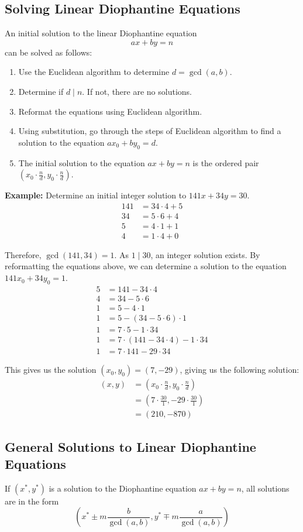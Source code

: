 \documentclass[12pt]{article}
\newcommand{\tdiv}{\; | \;}
\begin{document}
\subsection{Solving Linear Diophantine Equations}
An initial solution to the linear Diophantine equation $$ax + by = n$$ can be solved as follows:
\begin{enumerate}
    \item Use the Euclidean algorithm to determine $d = \gcd{(a, b)}$.
    \item Determine if $d \tdiv n$. If not, there are no solutions.
    \item Reformat the equations using Euclidean algorithm.
    \item Using substitution, go through the steps of Euclidean algorithm to find a solution to the equation $ax_0 + by_0 = d$.
    \item The initial solution to the equation $ax + by = n$ is the ordered pair $(x_0 \cdot \frac{n}{d}, y_0 \cdot \frac{n}{d})$.
\end{enumerate}

\textbf{Example:} Determine an initial integer solution to $141x + 34y = 30$.
\begin{align*}
    141 &= 34 \cdot 4 + 5 \\
    34 &= 5 \cdot 6 + 4 \\
    5 &= 4 \cdot 1 + 1 \\
    4 &= 1 \cdot 4 + 0
\end{align*}

Therefore, $\gcd{(141, 34)} = 1$. As $1\tdiv 30$, an integer solution exists. By reformatting the equations above, we can determine a solution to the equation $141x_0 + 34y_0 = 1$.
\begin{align*}
    5 &= 141 - 34 \cdot 4 \\
    4 &= 34 - 5 \cdot 6 \\
    1 &= 5 - 4 \cdot 1 \\
    1 &= 5 - (34 - 5 \cdot 6) \cdot 1 \\
    1 &= 7 \cdot 5 - 1 \cdot 34 \\
    1 &= 7 \cdot (141 - 34 \cdot 4) - 1 \cdot 34 \\
    1 &= 7 \cdot 141 - 29 \cdot 34
\end{align*}

This gives us the solution $(x_0, y_0) = (7, -29)$, giving us the following solution:
\begin{align*}
    (x, y) &= (x_0 \cdot \frac{n}{d}, y_0 \cdot \frac{n}{d}) \\
    &= (7 \cdot \frac{30}{1}, -29 \cdot \frac{30}{1}) \\
    &= (210, -870)
\end{align*}

\subsection{General Solutions to Linear Diophantine Equations}
If $(x^{*}, y^{*})$ is a solution to the Diophantine equation $ax + by = n$, all solutions are in the form $$(x^{*} \pm m \frac{b}{\gcd{(a, b)}}, y^{*} \mp m\frac{a}{\gcd{(a, b)}})$$
\end{document}

